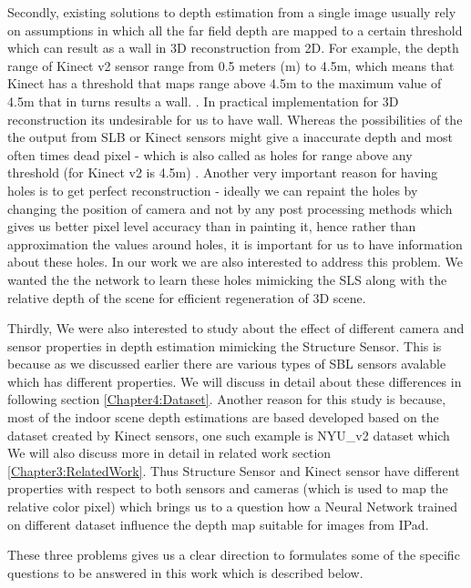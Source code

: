 Secondly, existing solutions to depth estimation from a single image usually rely on assumptions in which all the far field depth are mapped to a certain threshold which can result as a wall in 3D reconstruction from 2D. For example, the depth range of Kinect v2 sensor range from 0.5 meters (m) to 4.5m, which means that Kinect has a threshold that maps range above 4.5m to the maximum value of 4.5m that in turns results a wall. \cite{Silberman:ECCV12}. In practical implementation for 3D reconstruction its undesirable for us to have wall. Whereas the possibilities of the the output from SLB or Kinect sensors might give a inaccurate depth and most often times dead pixel - which is also called as holes for range above any threshold (for Kinect v2 is 4.5m) \cite{kinecttof}. Another very important reason for having holes is to get perfect reconstruction - ideally we can repaint the holes by changing the position of camera and not by any post processing methods which gives us better pixel level accuracy than in painting it, hence rather than approximation the values around holes, it is important for us to have information about these holes. In our work we are also interested to address this problem. We wanted the the network to learn these holes mimicking the SLS along with the relative depth of the scene for efficient regeneration of 3D scene. 

Thirdly, We were also interested to study about the effect of different camera and sensor properties in depth estimation mimicking the  Structure Sensor. This is because as we discussed earlier there are various types of SBL sensors avalable which has different properties. We will discuss in detail about these differences in following section \ref{Chapter4:Dataset}. Another reason for this study is because, most of the indoor scene depth estimations are based developed based on the dataset created by Kinect sensors, one such example is NYU\_v2 dataset \cite{silberman11indoor} which We will also discuss more in detail in related work section \ref{Chapter3:RelatedWork}. Thus Structure Sensor and Kinect sensor have different properties with respect to both sensors and cameras (which is used to map the relative color pixel) which brings us to a question how a Neural Network trained on different dataset influence the depth map suitable for images from IPad.  

These three problems gives us a clear direction to formulates some of the specific questions to be answered in this work which is described below. 


